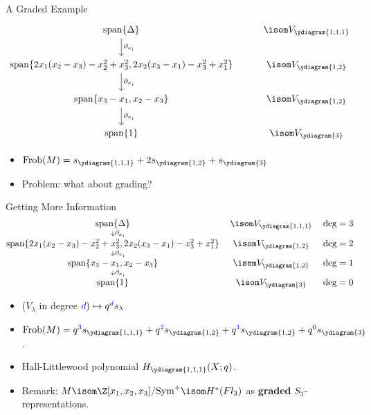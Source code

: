 \documentclass[dvipsnames]{beamer}
\renewcommand{\Span}{\operatorname{span}}
\theoremstyle{definition}
\newcounter{c}
\begin{document}
\begin{frame}{A Graded Example}
     \[
   \begin{tikzcd}[ampersand replacement=\&]
     \Span \{\Delta \} \ar[d, "\partial_{x_i}"]\& \isom V_{\ydiagram{1,1,1}}\\
     \Span\{2x_1(x_2-x_3)-x_2^2+x_3^2, 2x_2(x_3-x_1)-x_3^2+x_1^2\}
     \ar[d,"\partial_{x_i}"] \& \isom V_{\ydiagram{1,2}}\\
     \Span\{x_3-x_1, x_2-x_3\} \ar[d,"\partial_{x_i}"] \& \isom V_{\ydiagram{1,2}}\\
     \Span\{1\} \& \isom V_{\ydiagram{3}}
   \end{tikzcd}
   \]\pause
   \begin{itemize}
   \item \(\operatorname{Frob}(M) = s_{\ydiagram{1,1,1}} + 2
     s_{\ydiagram{1,2}} + s_{\ydiagram{3}}\) \pause 
   \item Problem: what about grading?
   \end{itemize}
 \end{frame}
\begin{frame}{Getting More Information}
     \[
   \begin{tikzcd}[ampersand replacement=\&, cramped, sep=tiny]
     \Span \{\Delta \} \ar[d, "\partial_{x_i}"]\& \isom
     V_{\ydiagram{1,1,1}} \& \deg = 3\\
     \Span\{2x_1(x_2-x_3)-x_2^2+x_3^2, 2x_2(x_3-x_1)-x_3^2+x_1^2\}
     \ar[d,"\partial_{x_i}"] \& \isom V_{\ydiagram{1,2}} \& \deg = 2\\
     \Span\{x_3-x_1, x_2-x_3\} \ar[d,"\partial_{x_i}"] \& \isom
     V_{\ydiagram{1,2}} \& \deg = 1\\
     \Span\{1\} \& \isom V_{\ydiagram{3}} \& \deg = 0
   \end{tikzcd}
   \]\pause
   \begin{itemize}
   \item  (\(V_\lambda\) in degree \(\textcolor{blue}{d}) \mapsto
     q^{\textcolor{blue}{d}} s_\lambda\)\pause
   \item \(\operatorname{Frob}(M) =  q^{\textcolor{blue}{3}}
     s_{\ydiagram{1,1,1}} + q^{\textcolor{blue}{2}} s_{\ydiagram{1,2}}
     + q^{\textcolor{blue}{1}} s_{\ydiagram{1,2}} + q^{\textcolor{blue}{0}}s_{\ydiagram{3}}\).\pause
   \item Hall-Littlewood polynomial \(H_{\ydiagram{1,1,1}}(X;q)\).\pause
   \item Remark: \(M \isom \Z[x_1,x_2,x_3]/\text{Sym}^+ \isom H^*(Fl_3)\) as
  \textbf{graded} \(S_3\)-representations.
   \end{itemize}
 \end{frame}
\end{document}
